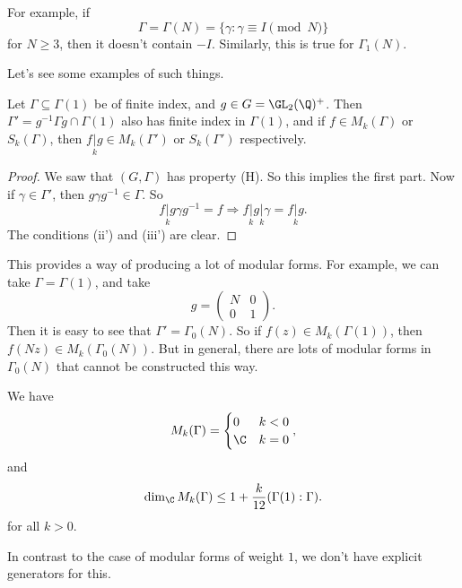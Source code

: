 \documentclass[a4paper]{article}
\begin{document}
For example, if
\[
  \Gamma = \Gamma(N) = \{\gamma: \gamma \equiv I \pmod N\}
\]
for $N \geq 3$, then it doesn't contain $-I$. Similarly, this is true for $\Gamma_1(N)$.

Let's see some examples of such things.

\begin{prop}
  Let $\Gamma \subseteq \Gamma(1)$ be of finite index, and $g \in G = \GL_2(\Q)^+$. Then $\Gamma' = g^{-1} \Gamma g \cap \Gamma(1)$ also has finite index in $\Gamma(1)$, and if $f \in M_k(\Gamma)$ or $S_k(\Gamma)$, then $f\underset{k}{|} g \in M_k(\Gamma')$ or $S_k(\Gamma')$ respectively.
\end{prop}

\begin{proof}
  We saw that $(G, \Gamma)$ has property (H). So this implies the first part. Now if $\gamma \in \Gamma'$, then $g\gamma g^{-1} \in \Gamma$. So
  \[
    f \underset{k}{|}g \gamma g^{-1} = f \Rightarrow f\underset{k}{|} g \underset{k}{|}\gamma = f\underset{k}{|} g.
  \]
  The conditions (ii') and (iii') are clear.
\end{proof}
This provides a way of producing a lot of modular forms. For example, we can take $\Gamma = \Gamma(1)$, and take
\[
  g =
  \begin{pmatrix}
    N & 0\\
    0 & 1
  \end{pmatrix}.
\]
Then it is easy to see that $\Gamma' = \Gamma_0(N)$. So if $f(z) \in M_k(\Gamma(1))$, then $f(Nz) \in M_k(\Gamma_0(N))$. But in general, there are lots of modular forms in $\Gamma_0(N)$ that cannot be constructed this way.

\begin{thm}
  We have
  \[
    M_k(\Gamma) =
    \begin{cases}
      0 & k < 0\\
      \C & k = 0
    \end{cases},
  \]
  and
  \[
    \dim_\C M_k(\Gamma) \leq 1 + \frac{k}{12} (\Gamma(1): \Gamma).
  \]
  for all $k > 0$.
\end{thm}
In contrast to the case of modular forms of weight $1$, we don't have explicit generators for this.
\end{document}

